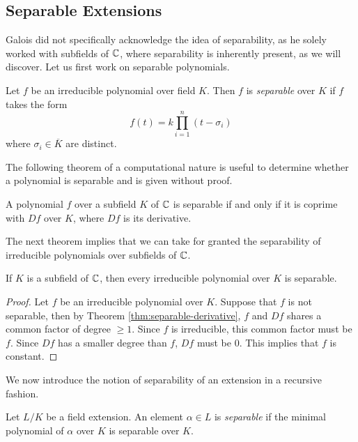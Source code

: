 \subsection{Separable Extensions}

Galois did not specifically acknowledge the idea of separability, as he solely worked with subfields of $\mathbb C$, where separability is inherently present, as we will discover. Let us first work on separable polynomials.

\begin{definition}
    Let $f$ be an irreducible polynomial over field $K$. Then $f$ is \textit{separable} over $K$ if $f$ takes the form 
    $$
        f(t) = k \prod_{i = 1} ^ n(t - \sigma_i)
    $$
    where $\sigma_i \in \overline K$ are distinct.
\end{definition}

The following theorem of a computational nature is useful to determine whether a polynomial is separable and is given without proof. 

\begin{theorem} \label{thm:separable-derivative}
    A polynomial $f$ over a subfield $K$ of $\mathbb C$ is separable if and only if it is coprime with $Df$ over $K$, where $Df$ is its derivative. 
\end{theorem}

The next theorem implies that we can take for granted the separability of irreducible polynomials over subfields of $\mathbb C$. 

\begin{theorem} \label{thm:separable-poly-in-C}
    If $K$ is a subfield of $\mathbb C$, then every irreducible polynomial over $K$ is separable. 
\end{theorem}

\begin{proof}
    Let $f$ be an irreducible polynomial over $K$. Suppose that $f$ is not separable, then by Theorem \ref{thm:separable-derivative}, $f$ and $Df$ shares a common factor of degree $\ge 1$. Since $f$ is irreducible, this common factor must be $f$. Since $Df$ has a smaller degree than $f$, $Df$ must be $0$. This implies that $f$ is constant.
\end{proof}

We now introduce the notion of separability of an extension in a recursive fashion.

\begin{definition}
    Let $L/K$ be a field extension. An element $\alpha \in L$ is \textit{separable} if the minimal polynomial of $\alpha$ over $K$ is separable over $K$.
\end{definition}

